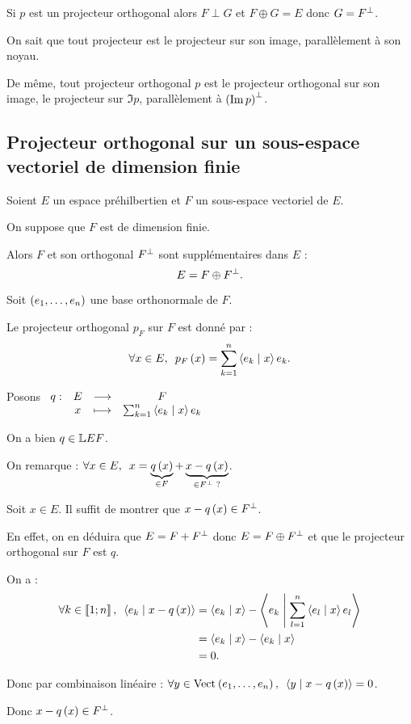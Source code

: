 \begin{dem}[1]
Si \(p\) est un projecteur orthogonal alors \(F\perp G\) et \(F\oplus G=E\) donc \(G=F^{\perp}\).
\end{dem}

\begin{rem}
On sait que tout projecteur est le projecteur sur son image, parallèlement à son noyau.

De même, tout projecteur orthogonal \(p\) est le projecteur orthogonal sur son image, \cad le projecteur sur \(\Im p\), parallèlement à \(\left(\operatorname{Im} p\right)^{\perp}\).
\end{rem}

\subsection{Projecteur orthogonal sur un sous-espace vectoriel de dimension finie}

\begin{deftheo}
Soient \(E\) un espace préhilbertien et \(F\) un sous-espace vectoriel de \(E\).

On suppose que \(F\) est de dimension finie.

Alors \(F\) et son orthogonal \(F^{\perp}\) sont supplémentaires dans \(E\) : \[E=F\oplus F^{\perp}.\]

Soit \(\left(e_1,\dots,e_n\right)\) une base orthonormale de \(F\).

Le projecteur orthogonal \(p_F\) sur \(F\) est donné par : \[\quantifs{\forall x\in E}p_F\paren{x}=\sum_{k=1}^{n}\ps{e_k}{x}e_k.\]
\end{deftheo}

\begin{dem}
Posons \(\begin{array}[t]{cccc}q : & E & \longrightarrow & F \\ & x & \longmapsto & \sum_{k=1}^{n}\left\langle e_k\;\middle|\; x\right\rangle e_k\end{array}\)

On a bien \(q\in\mathbb{L}{E}{F}\).

On remarque : \(\quantifs{\forall x\in E}x=\underbrace{q\paren{x}}_{\in F}+\underbrace{x-q\paren{x}}_{\in F\ortho\text{ ?}}\).

Soit \(x\in E\). Il suffit de montrer que \(x-q\left(x\right)\in F^{\perp}\).

En effet, on en déduira que \(E=F+F^{\perp}\) donc \(E=F\oplus F^{\perp}\) et que le projecteur orthogonal sur \(F\) est \(q\).

On a : \[\begin{aligned}
\quantifs{\forall k\in\interventierii{1}{n}}\ps{e_k}{x-q\paren{x}}&=\ps{e_k}{x}-\ps{e_k}{\sum_{l=1}^{n}\ps{e_l}{x}e_l} \\
&=\ps{e_k}{x}-\ps{e_k}{x} \\
&=0.
\end{aligned}\]

Donc par combinaison linéaire : \(\quantifs{\forall y\in\Vect{e_1,\dots,e_n}}\ps{y}{x-q\paren{x}}=0\).

Donc \(x-q\left(x\right)\in F^{\perp}\).
\end{dem}


